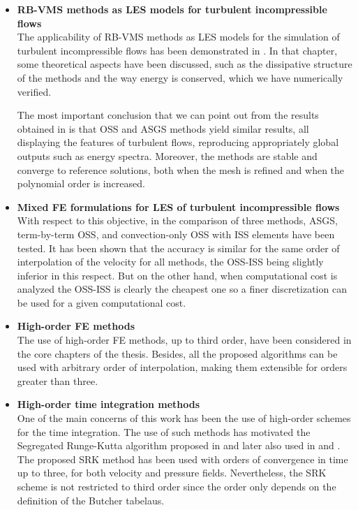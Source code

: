\begin{itemize}
\item {\bf RB-VMS methods as LES models for turbulent incompressible flows}\\
The applicability of RB-VMS methods as LES models for the simulation of turbulent incompressible flows has been demonstrated in . In that chapter, some theoretical aspects have been discussed, such as the dissipative structure of the methods and the way energy is conserved, which we have numerically verified.

The most important conclusion that we can point out from the results obtained in  is that OSS and ASGS methods yield similar results, all displaying the features of turbulent flows, reproducing appropriately global outputs such as energy spectra. Moreover, the methods are stable and converge to reference solutions, both when the mesh is refined and when the polynomial order is increased.

\item {\bf Mixed FE formulations for LES of turbulent incompressible flows}\\
With respect to this objective, in  the comparison of three methods, ASGS, term-by-term OSS, and convection-only OSS with ISS elements have been tested. It has been shown that the accuracy is similar for the same order of interpolation of the velocity for all methods, the OSS-ISS being slightly inferior in this respect. But on the other hand, when computational cost is analyzed the OSS-ISS is clearly the cheapest one so a finer discretization can be used for a given computational cost.

\item {\bf High-order FE methods}\\
The use of high-order FE methods, up to third order, have been considered in the core chapters of the thesis. Besides, all the proposed algorithms can be used with arbitrary order of interpolation, making them extensible for orders greater than three.

\item {\bf High-order time integration methods}\\
One of the main concerns of this work has been the use of high-order schemes for the time integration. The use of such methods has motivated the Segregated Runge-Kutta algorithm proposed in  and later also used in  and . The proposed SRK method has been used with orders of convergence in time up to three, for both velocity and pressure fields. Nevertheless, the SRK scheme is not restricted to third order since the order only depends on the definition of the Butcher tabelaus.


\end{itemize}
